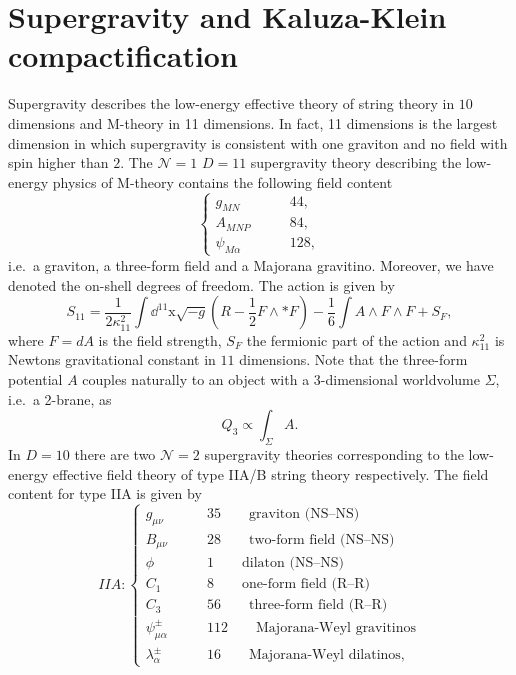 \section{Supergravity and Kaluza-Klein compactification\label{sec:Supergravity}}
Supergravity describes the low-energy effective theory of string theory in $10$ dimensions and M-theory in 11 dimensions. In fact, 11 dimensions is the largest dimension in which supergravity is consistent with one graviton and no field with spin higher than $2$. The $\mathcal{N}=1$ $D=11$ supergravity theory describing the low-energy physics of M-theory contains the following field content 
\begin{equation}
    \begin{cases}
        g_{MN} \qquad &44,\\
        A_{MNP} \qquad &84,\\
        \psi_{M\alpha} \qquad &128,
    \end{cases}
\end{equation}
i.e.\ a graviton, a three-form field and a Majorana gravitino. Moreover, we have denoted the on-shell degrees of freedom. The action is given by 
\begin{equation}
    S_{11} = \frac{1}{2\kappa_{11}^2}\int\dd^{11}\mathrm{x}\sqrt{-g}\left(R-\frac{1}{2}F\wedge *F\right)-\frac{1}{6}\int A \wedge F\wedge F+S_F, 
\end{equation}
where $F=dA$ is the field strength, $S_F$ the fermionic part of the action and $\kappa_{11}^2$ is Newtons gravitational constant in $11$ dimensions. Note that the three-form potential $A$ couples naturally to an object with a 3-dimensional worldvolume $\Sigma$, i.e.\ a 2-brane, as 
\begin{equation}
    Q_3 \propto \int_{\Sigma}A.
\end{equation}
In $D=10$ there are two $\mathcal{N}=2$ supergravity theories corresponding to the low-energy effective field theory of type IIA/B string theory respectively. The field content for type IIA is given by 
\begin{equation*}
    IIA: \begin{cases}
                g_{\mu\nu} \qquad &35 \qquad \text{graviton (NS--NS)}\\
                B_{\mu\nu} \qquad &28 \qquad  \text{two-form field (NS--NS)}\\
                \phi\qquad &1 \qquad  \text{dilaton (NS--NS)}\\
                C_{1}\qquad &8 \qquad  \text{one-form field (R--R)}\\
                C_{3}\qquad &56 \qquad  \text{three-form field  (R--R)}\\
                \psi_{\mu\alpha}^\pm\qquad &112\qquad \text{Majorana-Weyl gravitinos}\\
                \lambda_\alpha^\pm \qquad &16\qquad \text{Majorana-Weyl dilatinos},
          \end{cases}
\end{equation*}
